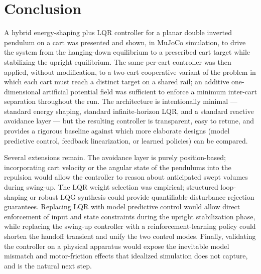 \documentclass[conference]{IEEEtran}
\begin{document}
\section{Conclusion}\label{sec:conclusion}

A hybrid energy-shaping plus LQR controller for a planar double inverted pendulum on a cart was presented and shown, in MuJoCo simulation, to drive the system from the hanging-down equilibrium to a prescribed cart target while stabilizing the upright equilibrium. The same per-cart controller was then applied, without modification, to a two-cart cooperative variant of the problem in which each cart must reach a distinct target on a shared rail; an additive one-dimensional artificial potential field was sufficient to enforce a minimum inter-cart separation throughout the run. The architecture is intentionally minimal --- standard energy shaping, standard infinite-horizon LQR, and a standard reactive avoidance layer --- but the resulting controller is transparent, easy to retune, and provides a rigorous baseline against which more elaborate designs (model predictive control, feedback linearization, or learned policies) can be compared.

Several extensions remain. The avoidance layer is purely position-based; incorporating cart velocity or the angular state of the pendulums into the repulsion would allow the controller to reason about anticipated swept volumes during swing-up. The LQR weight selection was empirical; structured loop-shaping or robust LQG synthesis \cite{anderson1990optimal} could provide quantifiable disturbance rejection guarantees. Replacing LQR with model predictive control \cite{mayne2000mpc} would allow direct enforcement of input and state constraints during the upright stabilization phase, while replacing the swing-up controller with a reinforcement-learning policy \cite{tedrake2023underactuated} could shorten the handoff transient and unify the two control modes. Finally, validating the controller on a physical apparatus would expose the inevitable model mismatch and motor-friction effects that idealized simulation does not capture, and is the natural next step.



\end{document}
